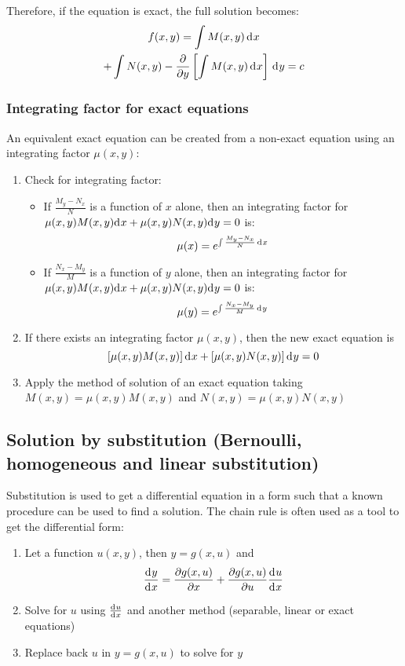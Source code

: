 \documentclass[10pt, twocolumn]{article}
\theoremstyle{definition}
\begin{document}
Therefore, if the equation is exact, the full solution becomes:
\begin{multline*}
  f(x,y) = \int{M(x,y)\,\mathrm{d}^{} x} \\
  + \int{N(x,y) - \frac{\partial }{\partial y}\left[ \int{M(x,y)\,\mathrm{d}^{} x} \right]\,\mathrm{d}^{} y} = c
\end{multline*}


\subsubsection*{Integrating factor for exact equations}
An equivalent exact equation can be created from a non-exact equation using an integrating factor \(\mu(x,y)\):
\begin{enumerate}
  \item Check for integrating factor:
        \begin{itemize}
          \item If \(\frac{M_y - N_x}{N}\) is a function of \(x\) alone, then an integrating factor for \(\mu(x,y)M(x,y)\mathrm{d}^{} x + \mu(x,y)N(x,y)\mathrm{d}^{} y = 0\) is:
                \[
                  \mu(x) = e^{\int{\frac{M_y - N_x}{N} \,\mathrm{d}^{} x}}
                \]
          \item If \(\frac{N_x - M_y}{M}\) is a function of \(y\) alone, then an integrating factor for \(\mu(x,y)M(x,y)\mathrm{d}^{} x + \mu(x,y)N(x,y)\mathrm{d}^{} y = 0\) is:
                \[
                  \mu(y) = e^{\int{\frac{N_x - M_y}{M} \,\mathrm{d}^{} y}}
                \]
        \end{itemize}
  \item If there exists an integrating factor \(\mu(x,y)\), then the new exact equation is
        \[
          \left[ \mu(x,y)M(x,y) \right]\mathrm{d}^{} x + \left[ \mu(x,y)N(x,y) \right]\mathrm{d}^{} y = 0
        \]
  \item Apply the method of solution of an exact equation taking \(M(x,y) = \mu(x,y)M(x,y)\) and \(N(x,y) = \mu(x,y)N(x,y)\)
\end{enumerate}


\subsection{Solution by substitution (Bernoulli, homogeneous and linear substitution)}
Substitution is used to get a differential equation in a form such that a known procedure can be used to find a solution.
The chain rule is often used as a tool to get the differential form:
\begin{enumerate}
  \item Let a function \(u(x,y)\), then \(y = g(x,u)\) and
        \[
          \frac{\mathrm{d}^{} y}{\mathrm{d}^{} x} = \frac{\partial g(x, u)}{\partial x} + \frac{\partial g(x, u)}{\partial u}\frac{\mathrm{d}^{} u}{\mathrm{d}^{} x}
        \]
  \item Solve for \(u\) using \(\frac{\mathrm{d}^{} u}{\mathrm{d}^{} x}\) and another method (separable, linear or exact equations)
  \item Replace back \(u\) in \(y = g(x,u)\) to solve for \(y\)
\end{enumerate}
\end{document}
